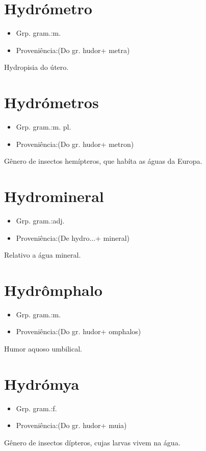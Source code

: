 \documentclass{article}
\begin{document}
\section{Hydrómetro}
\begin{itemize}
\item {Grp. gram.:m.}
\end{itemize}
\begin{itemize}
\item {Proveniência:(Do gr. \textunderscore hudor\textunderscore  + \textunderscore metra\textunderscore )}
\end{itemize}
Hydropisia do útero.
\section{Hydrómetros}
\begin{itemize}
\item {Grp. gram.:m. pl.}
\end{itemize}
\begin{itemize}
\item {Proveniência:(Do gr. \textunderscore hudor\textunderscore  + \textunderscore metron\textunderscore )}
\end{itemize}
Gênero de insectos hemípteros, que habíta as águas da Europa.
\section{Hydromineral}
\begin{itemize}
\item {Grp. gram.:adj.}
\end{itemize}
\begin{itemize}
\item {Proveniência:(De \textunderscore hydro...\textunderscore  + \textunderscore mineral\textunderscore )}
\end{itemize}
Relativo a água mineral.
\section{Hydrômphalo}
\begin{itemize}
\item {Grp. gram.:m.}
\end{itemize}
\begin{itemize}
\item {Proveniência:(Do gr. \textunderscore hudor\textunderscore  + \textunderscore omphalos\textunderscore )}
\end{itemize}
Humor aquoso umbilical.
\section{Hydrómya}
\begin{itemize}
\item {Grp. gram.:f.}
\end{itemize}
\begin{itemize}
\item {Proveniência:(Do gr. \textunderscore hudor\textunderscore  + \textunderscore muia\textunderscore )}
\end{itemize}
Gênero de insectos dípteros, cujas larvas vivem na água.
\end{document}
